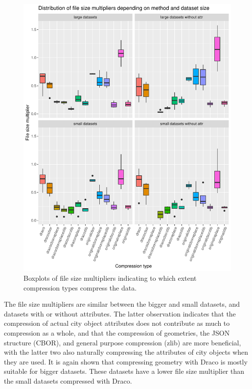 \begin{figure}[h!]
    \includegraphics[scale=0.88]{figs/benchmark/overview/filesizemultipliers.pdf}
    \caption{Boxplots of file size multipliers indicating to which extent compression types compress the data.}
    \label{fig:filesizeperformance}
\end{figure}

The file size multipliers are similar between the bigger and small datasets, and datasets with or without attributes.
The latter observation indicates that the compression of actual city object attributes does not contribute as much to compression as a whole, and that the compression of geometries, the JSON structure (CBOR), and general purpose compression (zlib) are more beneficial, with the latter two also naturally compressing the attributes of city objects when they are used.
It is again shown that compressing geometry with Draco is mostly suitable for bigger datasets.
These datasets have a lower file size multiplier than the small datasets compressed with Draco.

